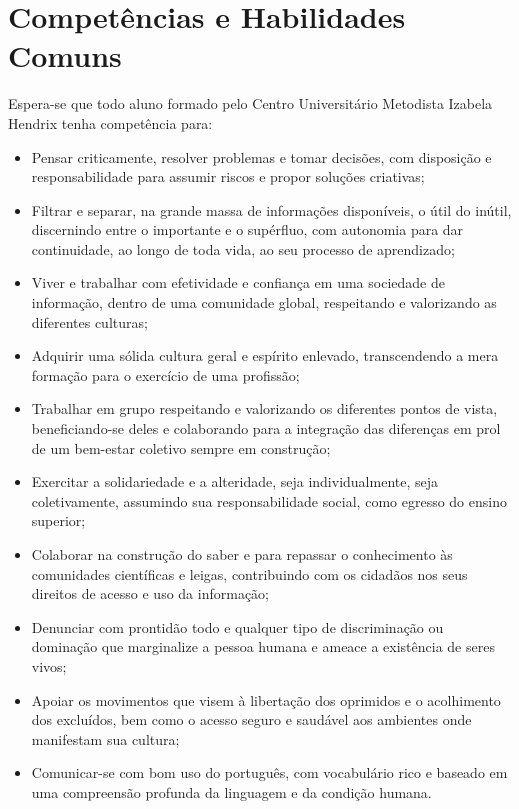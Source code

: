 \documentclass[a4paper, 12pt, openright, oneside, german, french, english, brazil]{abntex2}
\begin{document}
\section{Competências e Habilidades Comuns}

Espera-se que todo aluno formado pelo Centro Universitário Metodista Izabela Hendrix tenha competência para:

\begin{itemize}
\item Pensar criticamente, resolver problemas e tomar decisões, com disposição e responsabilidade para assumir riscos e propor soluções criativas;
\item Filtrar e separar, na grande massa de informações disponíveis, o útil do inútil, discernindo entre o importante e o supérfluo, com autonomia para dar continuidade, ao longo de toda vida, ao seu processo de aprendizado;
\item Viver e trabalhar com efetividade e confiança em uma sociedade de informação, dentro de uma comunidade global, respeitando e valorizando as diferentes culturas;
\item Adquirir uma sólida cultura geral e espírito enlevado, transcendendo a mera formação para o exercício de uma profissão;
\item Trabalhar em grupo respeitando e valorizando os diferentes pontos de vista, beneficiando-se deles e colaborando para a integração das diferenças em prol de um bem-estar coletivo sempre em construção;
\item Exercitar a solidariedade e a alteridade, seja individualmente, seja coletivamente, assumindo sua responsabilidade social, como egresso do ensino superior;
\item Colaborar na construção do saber e para repassar o conhecimento às comunidades científicas e leigas, contribuindo com os cidadãos nos seus direitos de acesso e uso da informação;
\item Denunciar com prontidão todo e qualquer tipo de discriminação ou dominação que marginalize a pessoa humana e ameace a existência de seres vivos;
\item Apoiar os movimentos que visem à libertação dos oprimidos e o acolhimento dos excluídos, bem como o acesso seguro e saudável aos ambientes onde manifestam sua cultura;
\item Comunicar-se com bom uso do português, com vocabulário rico e baseado em uma compreensão profunda da linguagem e da condição humana.
\end{itemize}
\end{document}
